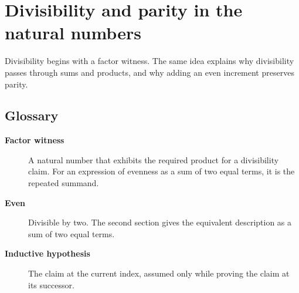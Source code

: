 \documentclass{article}
\begin{document}
\section*{Divisibility and parity in the natural numbers}

Divisibility begins with a factor witness. The same idea explains why divisibility passes through sums and products, and why adding an even increment preserves parity.

\subsection*{Glossary}
\begin{description}
\item[{\normalfont\bfseries Factor witness}] A natural number that exhibits the required product for a divisibility claim. For an expression of evenness as a sum of two equal terms, it is the repeated summand.
\item[{\normalfont\bfseries Even}] Divisible by two. The second section gives the equivalent description as a sum of two equal terms.
\item[{\normalfont\bfseries Inductive hypothesis}] The claim at the current index, assumed only while proving the claim at its successor.
\end{description}
\end{document}
